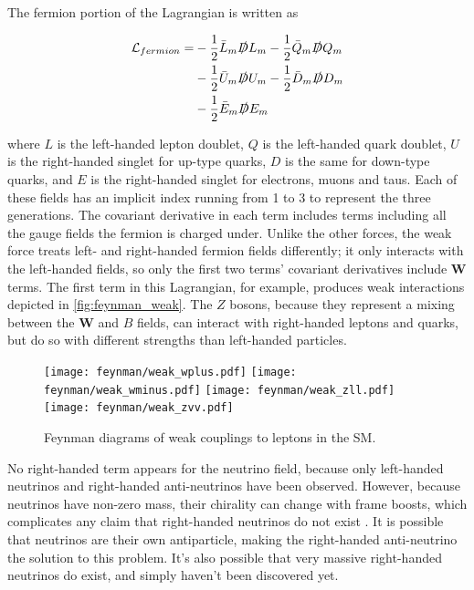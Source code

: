 The fermion portion of the Lagrangian is written as

\begin{equation}
\begin{split}
\mathcal{L}_{fermion} = & -\frac{1}{2}\bar{L}_m\slashed{D}L_m -\frac{1}{2}\bar{Q}_m\slashed{D}Q_m \\
						& -\frac{1}{2}\bar{U}_m\slashed{D}U_m -\frac{1}{2}\bar{D}_m\slashed{D}D_m \\
						& -\frac{1}{2}\bar{E}_m\slashed{D}E_m \\
\end{split}
\end{equation}

where $L$ is the left-handed lepton doublet, $Q$ is the left-handed quark doublet, $U$ is the right-handed singlet for up-type quarks, $D$ is the same for down-type quarks, and $E$ is the right-handed singlet for electrons, muons and taus. Each of these fields has an implicit index running from 1 to 3 to represent the three generations. The covariant derivative in each term includes terms including all the gauge fields the fermion is charged under. Unlike the other forces, the weak force treats left- and right-handed fermion fields differently; it only interacts with the left-handed fields, so only the first two terms' covariant derivatives include $\bm{W}$ terms. The first term in this Lagrangian, for example, produces weak interactions depicted in \autoref{fig:feynman_weak}. The $Z$ bosons, because they represent a mixing between the $\bm{W}$ and $B$ fields, can interact with right-handed leptons and quarks, but do so with different strengths than left-handed particles.

\begin{centering}
\begin{figure}[!hbt]
\myfloatalign
\texttt{[image: feynman/weak\_wplus.pdf]}
\texttt{[image: feynman/weak\_wminus.pdf]}
\texttt{[image: feynman/weak\_zll.pdf]}
\texttt{[image: feynman/weak\_zvv.pdf]}
\caption{Feynman diagrams of weak couplings to leptons in the \ac{SM}.}
\label{fig:feynman_weak}
\end{figure}
\end{centering}

No right-handed term appears for the neutrino field, because only left-handed neutrinos and right-handed anti-neutrinos have been observed. However, because neutrinos have non-zero mass, their chirality can change with frame boosts, which complicates any claim that right-handed neutrinos do not exist \cite{Burgess:2007zi}. It is possible that neutrinos are their own antiparticle, making the right-handed anti-neutrino the solution to this problem. It's also possible that very massive right-handed neutrinos do exist, and simply haven't been discovered yet. 

